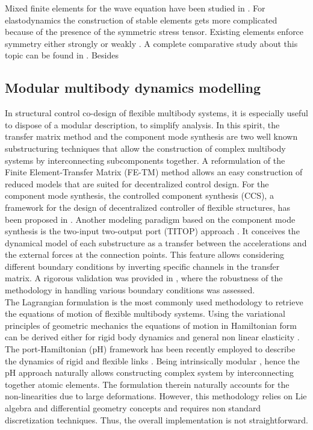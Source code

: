 Mixed finite elements for the wave equation have been studied in \cite{geveci1988,becache2000wave}. For elastodynamics the construction of stable elements gets more complicated because of the presence of the symmetric stress tensor. Existing elements enforce symmetry either strongly \cite{becache2001elas,arnold2002mixed} or weakly \cite{arnold2007mixed,arnold2014elastodynamics}. A complete comparative study about this topic can be found in \cite{lee2012mixed}. Besides

\subsection{Modular multibody dynamics modelling}

In structural control co-design of flexible multibody systems, it is especially useful to dispose of a modular description, to simplify analysis. In this spirit, the transfer matrix method \cite{rong2010transfer} and the component mode synthesis \cite{hurty1965cms} are two well known substructuring techniques that allow the construction of complex multibody systems by interconnecting subcomponents together. A reformulation of the Finite Element-Transfer Matrix (FE-TM) method \cite{tan1990transfer} allows an easy construction of reduced models that are suited for decentralized control design. For the component mode synthesis, the controlled component synthesis (CCS), a framework for the design of decentralized controller of flexible structures, has been proposed in \cite{young1990}. Another modeling paradigm based on the component mode synthesis is the two-input two-output port (TITOP) approach \cite{alazard2015titop}. It conceives the dynamical model of each substructure as a transfer between the accelerations and the external forces at the connection points. This feature allows considering different boundary conditions by inverting specific channels in the transfer matrix. A rigorous validation was provided in \cite{perez2016flexible,sanfedino2018finite}, where the robustness of the methodology in handling various boundary conditions was assessed. \\
\indent The Lagrangian formulation is the most commonly used methodology to retrieve the equations of motion of flexible multibody systems. {Using the variational principles of geometric mechanics the equations of motion in Hamiltonian form can be derived either for rigid body dynamics \cite[Proposition 7.1.1]{holm2008geometric} and general non linear elasticity \cite[Chapter 3]{marsden1981lectures}.} The port-Hamiltonian (pH) framework \cite{duindam2009} has been recently employed to describe the dynamics of rigid and flexible links \cite{macchelli2007link,macchelli2009multi}. Being intrinsically modular , hence the pH approach naturally allows constructing complex system by interconnecting together atomic elements. The formulation therein naturally accounts for the non-linearities due to large deformations.  However, this methodology relies on Lie algebra and differential geometry concepts and requires non standard discretization techniques. Thus, the overall implementation is not straightforward. \\
